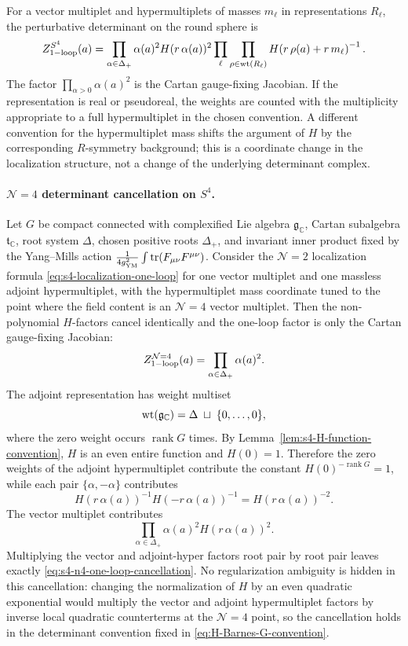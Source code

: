 For a vector multiplet and hypermultiplets of masses \(m_\ell\) in
representations \(R_\ell\), the perturbative determinant on the round sphere is
\begin{equation}
  Z_{1{\rm -loop}}^{S^4}(a)
  =
  \prod_{\alpha\in\Delta_+}
  \alpha(a)^2 H(r\,\alpha(a))^2
  \prod_\ell\prod_{\rho\in{\rm wt}(R_\ell)}
  H\!\left(r\,\rho(a)+r\,m_\ell\right)^{-1}.
  \label{eq:s4-localization-one-loop}
\end{equation}
The factor \(\prod_{\alpha>0}\alpha(a)^2\) is the Cartan gauge-fixing
Jacobian.  If the representation is real or pseudoreal, the weights are
counted with the multiplicity appropriate to a full hypermultiplet in the
chosen convention.  A different convention for the hypermultiplet mass shifts
the argument of \(H\) by the corresponding \(R\)-symmetry background; this is
a coordinate change in the localization structure, not a change of the underlying
determinant complex.

\paragraph{\(\mathcal N=4\) determinant cancellation on \(S^4\).}
Let \(G\) be compact connected with complexified Lie algebra
\(\mathfrak g_{\mathbb C}\), Cartan subalgebra \(\mathfrak t_{\mathbb C}\),
root system \(\Delta\), chosen positive roots \(\Delta_+\), and invariant
inner product fixed by the Yang--Mills action
\(\frac1{4g_{\rm YM}^2}\int \operatorname{tr}(F_{\mu\nu}F^{\mu\nu})\).
Consider the \(\mathcal N=2\) localization formula
\eqref{eq:s4-localization-one-loop} for one vector multiplet and one
massless adjoint hypermultiplet, with the hypermultiplet mass coordinate
tuned to the point where the field content is an \(\mathcal N=4\) vector
multiplet.  Then the non-polynomial \(H\)-factors cancel identically and the
one-loop factor is only the Cartan gauge-fixing Jacobian:
\begin{equation}
  Z_{1{\rm -loop}}^{\mathcal N=4}(a)
  =
  \prod_{\alpha\in\Delta_+}\alpha(a)^2 .
  \label{eq:s4-n4-one-loop-cancellation}
\end{equation}
The adjoint representation has weight multiset
\[
  {\rm wt}(\mathfrak g_{\mathbb C})
  =
  \Delta\;\sqcup\;\{0,\ldots,0\},
\]
where the zero weight occurs \(\operatorname{rank}G\) times.  By
Lemma~\ref{lem:s4-H-function-convention}, \(H\) is an even entire function
and \(H(0)=1\).  Therefore the zero weights of the adjoint hypermultiplet
contribute the constant \(H(0)^{-\operatorname{rank}G}=1\), while each pair
\(\{\alpha,-\alpha\}\) contributes
\[
  H(r\,\alpha(a))^{-1}H(-r\,\alpha(a))^{-1}
  =
  H(r\,\alpha(a))^{-2}.
\]
The vector multiplet contributes
\[
  \prod_{\alpha\in\Delta_+}\alpha(a)^2H(r\,\alpha(a))^2 .
\]
Multiplying the vector and adjoint-hyper factors root pair by root pair
leaves exactly \eqref{eq:s4-n4-one-loop-cancellation}.  No regularization
ambiguity is hidden in this cancellation: changing the normalization of
\(H\) by an even quadratic exponential would multiply the vector and adjoint
hypermultiplet factors by inverse local quadratic counterterms at the
\(\mathcal N=4\) point, so the cancellation holds in the determinant
convention fixed in \eqref{eq:H-Barnes-G-convention}.

